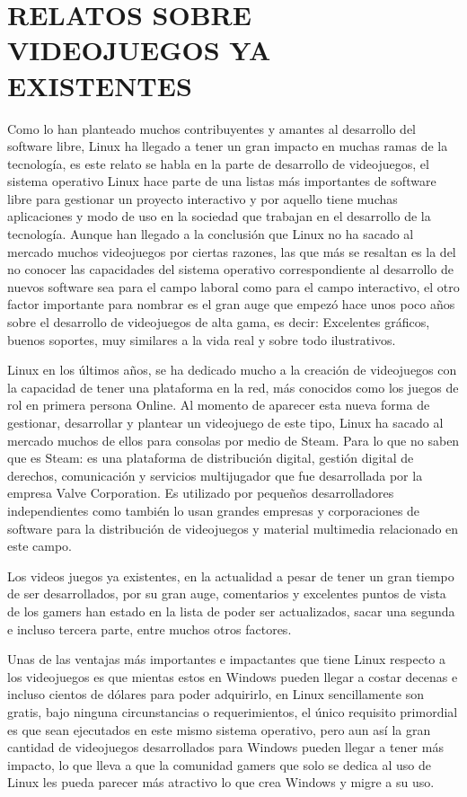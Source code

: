 \section*{RELATOS SOBRE VIDEOJUEGOS YA EXISTENTES}

Como lo han planteado muchos contribuyentes y amantes al
desarrollo del software libre, Linux ha llegado a tener un gran
impacto en muchas ramas de la tecnología, es este relato se
habla en la parte de desarrollo de videojuegos, el sistema
operativo Linux hace parte de una listas más importantes de
software libre para gestionar un proyecto interactivo y por
aquello tiene muchas aplicaciones y modo de uso en la sociedad
que trabajan en el desarrollo de la tecnología. Aunque han
llegado a la conclusión que Linux no ha sacado al mercado
muchos videojuegos por ciertas razones, las que más se resaltan
es la del no conocer las capacidades del sistema operativo
correspondiente al desarrollo de nuevos software sea para el
campo laboral como para el campo interactivo, el otro factor
importante para nombrar es el gran auge que empezó hace unos
poco años sobre el desarrollo de videojuegos de alta gama, es
decir: Excelentes gráficos, buenos soportes, muy similares a la vida real y sobre todo ilustrativos.

Linux en los últimos años, se ha dedicado mucho a la creación
de videojuegos con la capacidad de tener una plataforma en la
red, más conocidos como los juegos de rol en primera persona
Online. Al momento de aparecer esta nueva forma de gestionar,
desarrollar y plantear un videojuego de este tipo, Linux ha
sacado al mercado muchos de ellos para consolas por medio de
Steam. Para lo que no saben que es Steam: es una plataforma de
distribución digital, gestión digital de derechos, comunicación y
servicios multijugador que fue desarrollada por la empresa Valve
Corporation. Es utilizado por pequeños desarrolladores
independientes como también lo usan grandes empresas y
corporaciones de software para la distribución de videojuegos y
material multimedia relacionado en este campo.

Los videos juegos ya existentes, en la actualidad a pesar de
tener un gran tiempo de ser desarrollados, por su gran auge,
comentarios y excelentes puntos de vista de los gamers han
estado en la lista de poder ser actualizados, sacar una segunda e
incluso tercera parte, entre muchos otros factores.

Unas de las ventajas más importantes e impactantes que tiene
Linux respecto a los videojuegos es que mientas estos en
Windows pueden llegar a costar decenas e incluso cientos de
dólares para poder adquirirlo, en Linux sencillamente son gratis,
bajo ninguna circunstancias o requerimientos, el único requisito
primordial es que sean ejecutados en este mismo sistema
operativo, pero aun así la gran cantidad de videojuegos
desarrollados para Windows pueden llegar a tener más impacto,
lo que lleva a que la comunidad gamers que solo se dedica al uso
de Linux les pueda parecer más atractivo lo que crea Windows y
migre a su uso.

